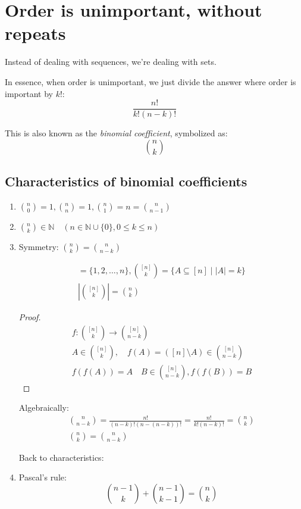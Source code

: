 \documentclass[00_complete]{subfiles}
\begin{document}
\section{Order is unimportant, without repeats}

Instead of dealing with sequences, we're dealing with sets.

In essence, when order is unimportant, we just divide the answer where order is
important by $k!$:
$$\frac{n!}{k!(n-k)!}$$

This is also known as the \emph{binomial coefficient}, symbolized as:
$$\binom{n}{k}$$

\subsection{Characteristics of binomial coefficients}
\begin{enumerate}
    \item $\displaystyle \binom{n}{0} = 1, \binom{n}{n} = 1, \binom{n}{1} = n = \binom{n}{n-1}$
    \item $\displaystyle \binom{n}{k} \in \mathbb{N} \quad (n \in \mathbb{N}\cup\{0\}, 0 \leq k \leq
   n)$
    \item Symmetry: $\displaystyle \binom{n}{k} = \binom{n}{n-k}$

\begin{symbols}
\begin{gather*}
[n] = \{1,2, \dots, n\}, \binom{[n]}{k} = \{A \subseteq [n] \mid |A| = k \} \\
\left|\binom{[n]}{k}\right| = \binom{n}{k}
\end{gather*}
\end{symbols}

\begin{proof}
\begin{gather*}
    f : \binom{[n]}{k} \to \binom{[n]}{n-k} \\
    A \in \binom{[n]}{k}, \quad f(A)=([n]\setminus A) \in \binom{[n]}{n-k} \\
    f(f(A)) = A \quad B \in \binom{[n]}{n-k}, f(f(B))=B
\end{gather*}
\end{proof}

Algebraically:
\begin{gather*}
\binom{n}{n-k} = \frac{n!}{(n-k)!(n-(n-k))!} = \frac{n!}{k!(n-k)!} = \binom{n}{k} \\
\binom{n}{k}=\binom{n}{n-k}
\end{gather*}


Back to characteristics:
\item Pascal's rule:
$$\binom{n-1}{k} + \binom{n-1}{k-1} = \binom{n}{k}$$
\end{enumerate}
\end{document}
